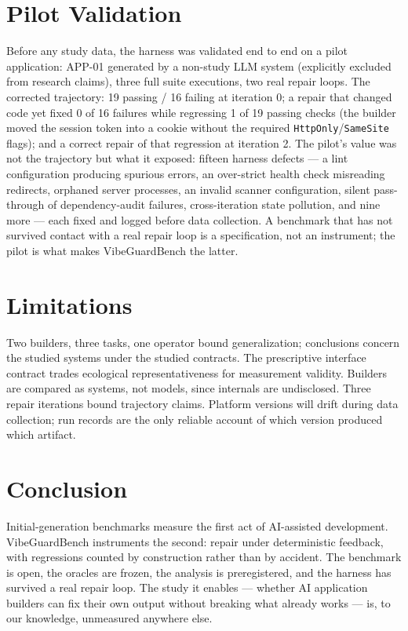 \documentclass[conference]{IEEEtran}
\begin{document}
\section{Pilot Validation}
Before any study data, the harness was validated end to end on a pilot
application: APP-01 generated by a non-study LLM system (explicitly excluded from
research claims), three full suite executions, two real repair loops. The
corrected trajectory: 19 passing / 16 failing at iteration 0; a repair that
changed code yet fixed 0 of 16 failures while regressing 1 of 19 passing checks
(the builder moved the session token into a cookie without the required
\texttt{HttpOnly}/\texttt{SameSite} flags); and a correct repair of that
regression at iteration 2. The pilot's value was not the trajectory but what it
exposed: fifteen harness defects --- a lint configuration producing spurious
errors, an over-strict health check misreading redirects, orphaned server
processes, an invalid scanner configuration, silent pass-through of
dependency-audit failures, cross-iteration state pollution, and nine more ---
each fixed and logged before data collection. A benchmark that has not survived
contact with a real repair loop is a specification, not an instrument; the pilot
is what makes VibeGuardBench the latter.

\section{Limitations}
Two builders, three tasks, one operator bound generalization; conclusions concern
the studied systems under the studied contracts. The prescriptive interface
contract trades ecological representativeness for measurement validity. Builders
are compared as systems, not models, since internals are undisclosed. Three
repair iterations bound trajectory claims. Platform versions will drift during
data collection; run records are the only reliable account of which version
produced which artifact.

\section{Conclusion}
Initial-generation benchmarks measure the first act of AI-assisted development.
VibeGuardBench instruments the second: repair under deterministic feedback, with
regressions counted by construction rather than by accident. The benchmark is
open, the oracles are frozen, the analysis is preregistered, and the harness has
survived a real repair loop. The study it enables --- whether AI application
builders can fix their own output without breaking what already works --- is,
to our knowledge, unmeasured anywhere else.
\end{document}
